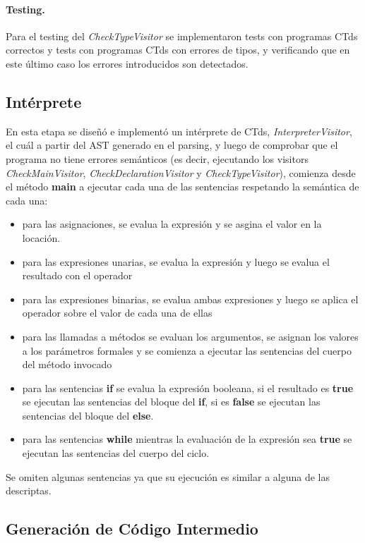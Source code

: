 \documentclass[11pt,a4paper]{article}
\begin{document}
\paragraph{Testing.} Para el testing del \textit{CheckTypeVisitor} se implementaron tests con programas CTds correctos y tests con programas CTds con errores de tipos, y verificando que en este último caso los errores introducidos son detectados.

\subsection{Intérprete} 
\label{subsec:interprete}

En esta etapa se diseñó e implementó un intérprete de CTds, \textit{InterpreterVisitor}, el cuál a partir del AST generado en el parsing, y luego de comprobar que el programa no tiene errores semánticos (es decir, ejecutando los visitors \textit{CheckMainVisitor}, \textit{CheckDeclarationVisitor} y \textit{CheckTypeVisitor}), comienza desde el método \textbf{main} a ejecutar cada una de las sentencias respetando la semántica de cada una:
\begin{itemize}
\item para las asignaciones, se evalua la expresión y se asgina el valor en la locación.
\item para las expresiones unarias, se evalua la expresión y luego se evalua el resultado con el operador
\item para las expresiones binarias, se evalua ambas expresiones y luego se aplica el operador sobre el valor de cada una de ellas
\item para las llamadas a métodos se evaluan los argumentos, se asignan los valores a los parámetros formales y se comienza a ejecutar las sentencias del cuerpo del método invocado
\item para las sentencias \textbf{if} se evalua la expresión booleana, si el resultado es \textbf{true} se ejecutan las sentencias del bloque del \textbf{if}, si es \textbf{false} se ejecutan las sentencias del bloque del \textbf{else}.
\item para las sentencias \textbf{while} mientras la evaluación de la expresión sea \textbf{true} se ejecutan las sentencias del cuerpo del ciclo.
\end{itemize}
Se omiten algunas sentencias ya que su ejecución es similar a alguna de las descriptas. 

\subsection{Generación de Código Intermedio} 
\label{subsec:genci}
\end{document}
